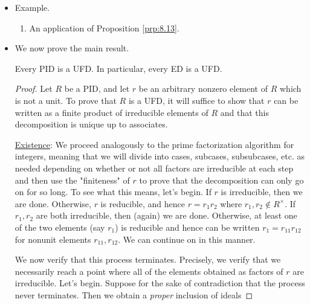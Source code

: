 \documentclass[../notes.tex]{subfiles}
\begin{document}
\begin{itemize}
\begin{proposition}
        are prime factorizations for $a$ and $b$, where $u,v$ are units, the primes $p_1,\dots,p_n$ are \emph{distinct}, and the exponents $e_i,f_i\geq 0$ ($i=1,\dots,n$). Then the element
        \begin{equation*}
            d = p_1^{\min(e_1,f_1)}\cdots p_n^{\min(e_n,f_n)}
        \end{equation*}
        (where $d=1$ if all the exponents are 0) is a gcd of $a,b$.
        \begin{proof}
            Given (not directly covered in class; related to Statement (*) from Lecture 5.1).
        \end{proof}
    \end{proposition}
    \item Example.
    \begin{enumerate}
        \item An application of Proposition \ref{prp:8.13}.
    \end{enumerate}
    \item We now prove the main result.
    \begin{theorem}\label{trm:8.14}
        Every PID is a UFD. In particular, every ED is a UFD.
        \begin{proof}
            Let $R$ be a PID, and let $r$ be an arbitrary nonzero element of $R$ which is not a unit. To prove that $R$ is a UFD, it will suffice to show that $r$ can be written as a finite product of irreducible elements of $R$ and that this decomposition is unique up to associates.\par\smallskip
            \underline{Existence}: We proceed analogously to the prime factorization algorithm for integers, meaning that we will divide into cases, subcases, subsubcases, etc. as needed depending on whether or not all factors are irreducible at each step and then use the "finiteness" of $r$ to prove that the decomposition can only go on for so long. To see what this means, let's begin. If $r$ is irreducible, then we are done. Otherwise, $r$ is reducible, and hence $r=r_1r_2$ where $r_1,r_2\notin R^\times$. If $r_1,r_2$ are both irreducible, then (again) we are done. Otherwise, at least one of the two elements (say $r_1$) is reducible and hence can be written $r_1=r_{11}r_{12}$ for nonunit elements $r_{11},r_{12}$. We can continue on in this manner.\par
            We now verify that this process terminates. Precisely, we verify that we necessarily reach a point where all of the elements obtained as factors of $r$ are irreducible. Let's begin. Suppose for the sake of contradiction that the process never terminates. Then we obtain a \emph{proper} inclusion of ideals

\end{proof}
\end{theorem}
\end{itemize}
\end{document}
